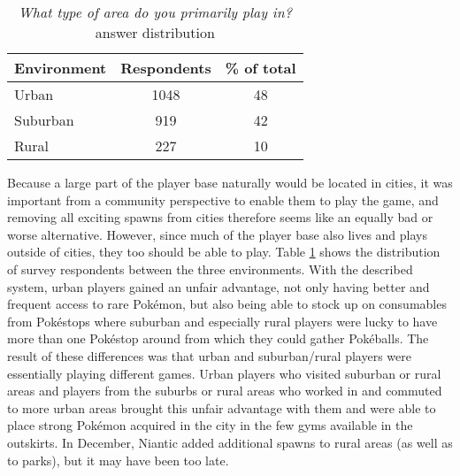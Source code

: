 \begin{table}[h]
	\centering
	\begin{tabular}{|l|c|c|}
		\hline
		\textbf{Environment} & \textbf{Respondents} & \textbf{\% of total}\\\hline\hline
		Urban & 1048 & 48\\\hline
		Suburban & 919 & 42\\\hline
		Rural & 227 & 10\\\hline
	\end{tabular}
	\caption{\emph{What type of area do you primarily play in?} answer distribution}
	\label{tbl:urban-level-distribution}
\end{table}

Because a large part of the player base naturally would be located in cities, it was important from a community perspective to enable them to play the game, and removing all exciting spawns from cities therefore seems like an equally bad or worse alternative. However, since much of the player base also lives and plays outside of cities, they too should be able to play. Table \ref{tbl:urban-level-distribution} shows the distribution of survey respondents between the three environments. With the described system, urban players gained an unfair advantage, not only having better and frequent access to rare Pokémon, but also being able to stock up on consumables from Pokéstops where suburban and especially rural players were lucky to have more than one Pokéstop around from which they could gather Pokéballs. The result of these differences was that urban and suburban/rural players were essentially playing different games. Urban players who visited suburban or rural areas and players from the suburbs or rural areas who worked in and commuted to more urban areas brought this unfair advantage with them and were able to place strong Pokémon acquired in the city in the few gyms available in the outskirts. In December, Niantic added additional spawns to rural areas (as well as to parks), but it may have been too late. 


